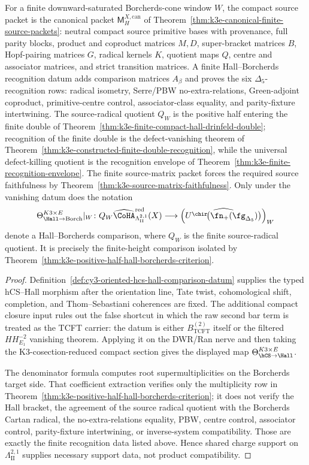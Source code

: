\begin{proposition}
For a finite downward-saturated Borcherds-cone window $W$, the compact
source packet is the canonical packet
\(\mathsf M_H^{X,\mathrm{can}}\) of
Theorem~\ref{thm:k3e-canonical-finite-source-packets}: neutral compact
source primitive bases with provenance, full parity blocks, product and
coproduct matrices $M,D$, super-bracket matrices $B$, Hopf-pairing
matrices $G$, radical kernels $K$, quotient maps $Q$, centre and
associator matrices, and strict transition matrices. A finite
Hall--Borcherds recognition datum adds comparison matrices \(A_\beta\)
and proves the six \(\Delta_5\)-recognition rows: radical isometry,
Serre/PBW no-extra-relations, Green-adjoint coproduct, primitive-centre
control, associator-class equality, and parity-fixture
intertwining. The source-radical quotient
\(Q_W\) is the positive half entering the finite double of
Theorem~\ref{thm:k3e-finite-compact-hall-drinfeld-double}; recognition
of the finite double is the defect-vanishing theorem of
Theorem~\ref{thm:k3e-constructed-finite-double-recognition}, while the
universal defect-killing quotient is the recognition envelope of
Theorem~\ref{thm:k3e-finite-recognition-envelope}. The finite
source-matrix packet forces the required source faithfulness by
Theorem~\ref{thm:k3e-source-matrix-faithfulness}. Only under the
vanishing datum does the notation
\[
\ThetaHallBorch|_W\colon
Q_W\widehat{\CoHA}^{\mathrm{red}}_{\Lambda^{2,1}_{\mathrm{II}}}(X)
\longrightarrow
\left(\widehat{U^{\chir}\!\bigl(\fn_+(\fg_{\Delta_5})\bigr)}\right)_W
\]
denote a Hall--Borcherds comparison, where $Q_W$ is the finite source-radical quotient. It is precisely the finite-height comparison isolated by Theorem~\ref{thm:k3e-positive-half-hall-borcherds-criterion}.
\end{proposition}

\begin{proof}
Definition~\ref{def:cy3-oriented-hcs-hall-comparison-datum} supplies the typed hCS--Hall morphism after the orientation line, Tate twist, cohomological shift, completion, and Thom--Sebastiani coherences are fixed. The additional compact closure input rules out the false shortcut in which the raw second bar term is treated as the TCFT carrier: the datum is either $B_{\mathrm{TCFT}}^{(2)}$ itself or the filtered $HH^{-2}_{E_1}$ vanishing theorem. Applying it on the DWR/Ran nerve and then taking the K3-cosection-reduced compact section gives the displayed map $\ThetaHCSHall$.

The denominator formula computes root supermultiplicities on the Borcherds target side. That coefficient extraction verifies only the multiplicity row in Theorem~\ref{thm:k3e-positive-half-hall-borcherds-criterion}; it does not verify the Hall bracket, the agreement of the source radical quotient with the Borcherds Cartan radical, the no-extra-relations equality, PBW, centre control, associator control, parity-fixture intertwining, or inverse-system compatibility. Those are exactly the finite recognition data listed above. Hence shared charge support on $\Lambda^{2,1}_{\mathrm{II}}$ supplies necessary support data, not product compatibility.
\end{proof}

